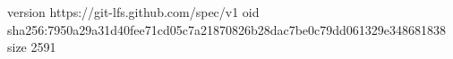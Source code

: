 version https://git-lfs.github.com/spec/v1
oid sha256:7950a29a31d40fee71cd05c7a21870826b28dac7be0c79dd061329e348681838
size 2591
